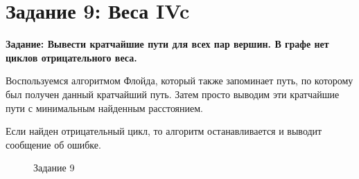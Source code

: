 \documentclass[otchet]{SCWorks}
\begin{document}
\section{Задание 9: Веса IVc}

\textbf{Задание: Вывести кратчайшие пути для всех пар вершин. В графе нет циклов отрицательного веса.}

Воспользуемся алгоритмом Флойда, который также запоминает путь, по которому был получен данный кратчайший путь. Затем просто выводим эти кратчайшие пути с минимальным найденным расстоянием.

Если найден отрицательный цикл, то алгоритм останавливается и выводит сообщение об ошибке.

\begin{figure}[H]
	\caption{Задание 9}
	\label{pic9_1}
\end{figure}
\end{document}
